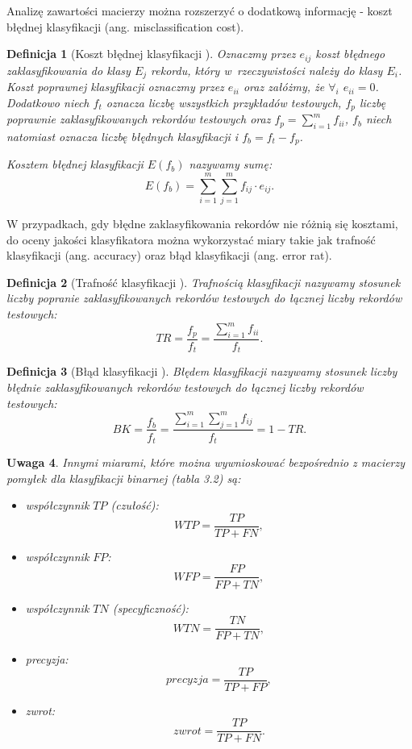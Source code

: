 \documentclass[12pt,a4paper]{report}
\newtheorem{df}{Definicja}[chapter]
\newtheorem{uwaga}[df]{Uwaga}
\begin{document}
Analizę zawartości macierzy można rozszerzyć o dodatkową informację - koszt błędnej klasyfikacji (ang. misclassification cost).
\begin{df}[Koszt błędnej klasyfikacji {\citep[Sec 4.8.1]{edmia}}]
Oznaczmy przez $e_{ij}$ koszt błędnego zaklasyfikowania do klasy $E_j$ rekordu, który w~rzeczywistości należy do klasy $E_i$.
Koszt poprawnej klasyfikacji oznaczmy przez $e_{ii}$ oraz załóżmy, że $\forall_{i}$ $ e_{ii} = 0$.
Dodatkowo niech $f_{t}$ oznacza liczbę wszystkich przykładów testowych, $f_{p}$ liczbę poprawnie zaklasyfikowanych rekordów testowych oraz $f_{p} = \sum_{i=1}^m f_{ii}$, $f_{b}$ niech natomiast oznacza liczbę błędnych klasyfikacji i $f_{b} = f_{t} - f_{p}$.

Kosztem błędnej klasyfikacji $E(f_{b})$ nazywamy sumę:
$$
E(f_{b}) = \sum_{i=1}^m \sum_{j=1}^m f_{ij} \cdot e_{ij}.
$$
\end{df}

W przypadkach, gdy błędne zaklasyfikowania rekordów nie różnią się kosztami, do oceny jakości klasyfikatora można wykorzystać miary takie jak trafność klasyfikacji (ang. accuracy) oraz błąd klasyfikacji (ang. error rat).
\begin{df}[Trafność klasyfikacji {\citep[Sec 4.8.1]{edmia}}]
Trafnością klasyfikacji nazywamy stosunek liczby popranie zaklasyfikowanych rekordów testowych do łącznej liczby rekordów testowych:
$$
TR= \frac{f_p}{f_t} = \frac{\sum_{i=1}^m f_{ii}}{f_t}.
$$
\end{df}
\begin{df}[Błąd klasyfikacji {\citep[Sec 4.8.1]{edmia}}]
Błędem klasyfikacji nazywamy stosunek liczby błędnie zaklasyfikowanych rekordów testowych do łącznej liczby rekordów testowych:
$$
BK = \frac{f_b}{f_t}=\frac{\sum_{i=1}^m \sum_{j=1}^m f_{ij}}{f_t}=1 - TR.
$$
\end{df}
\begin{uwaga}{\citep[Sec 4.8.1]{edmia}}
Innymi miarami, które można wywnioskować bezpośrednio z macierzy pomyłek dla klasyfikacji binarnej (tabla 3.2) są:
\begin{itemize}
\item współczynnik $TP$ (czułość):
$$
WTP = \frac{TP}{TP + FN},
$$
\item współczynnik $FP$:
$$
WFP = \frac{FP}{FP + TN},
$$
\item współczynnik $TN$ (specyficzność):
$$
WTN = \frac{TN}{FP + TN},
$$
\item precyzja:
$$
precyzja = \frac{TP}{TP + FP},
$$
\item zwrot:
$$
zwrot = \frac{TP}{TP + FN}.
$$
\end{itemize}
\end{uwaga}
\end{document}
